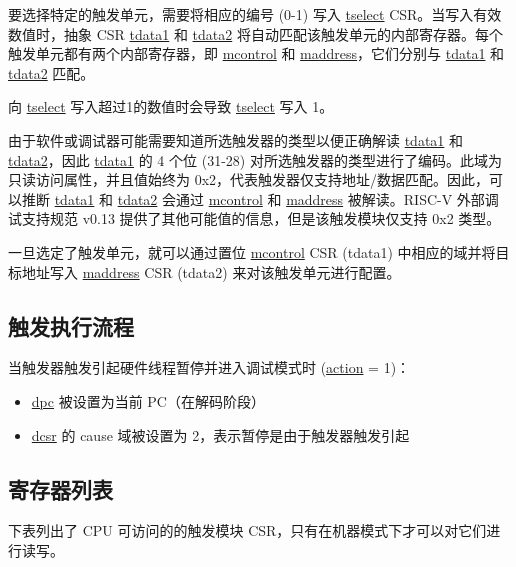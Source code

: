 \documentclass[main\_\_CN.tex]{subfiles}
\begin{document}
要选择特定的触发单元，需要将相应的编号 (0-1) 写入 \hyperref[regdesc:LPTSELECT]{tselect} CSR。当写入有效数值时，抽象 CSR \hyperref[regdesc:LPTDATA1]{tdata1} 和 \hyperref[regdesc:LPTDATA2]{tdata2} 将自动匹配该触发单元的内部寄存器。每个触发单元都有两个内部寄存器，即 \hyperref[regdesc:LPMCONTROL]{mcontrol} 和 \hyperref[regdesc:LPMADDRESS]{maddress}，它们分别与 \hyperref[regdesc:LPTDATA1]{tdata1} 和 \hyperref[regdesc:LPTDATA2]{tdata2} 匹配。

向 \hyperref[regdesc:LPTSELECT]{tselect} 写入超过1的数值时会导致 \hyperref[regdesc:LPTSELECT]{tselect} 写入 1。

由于软件或调试器可能需要知道所选触发器的类型以便正确解读 \hyperref[regdesc:LPTDATA1]{tdata1} 和 \hyperref[regdesc:LPTDATA2]{tdata2}，因此 \hyperref[regdesc:LPTDATA1]{tdata1} 的 4 个位 (31-28) 对所选触发器的类型进行了编码。此域为只读访问属性，并且值始终为 0x2，代表触发器仅支持地址/数据匹配。因此，可以推断 \hyperref[regdesc:LPTDATA1]{tdata1} 和 \hyperref[regdesc:LPTDATA2]{tdata2} 会通过 \hyperref[regdesc:LPMCONTROL]{mcontrol} 和 \hyperref[regdesc:LPMADDRESS]{maddress} 被解读。RISC-V 外部调试支持规范 v0.13 提供了其他可能值的信息，但是该触发模块仅支持 0x2 类型。

一旦选定了触发单元，就可以通过置位  \hyperref[regdesc:LPMCONTROL]{mcontrol} CSR (tdata1) 中相应的域并将目标地址写入 \hyperref[regdesc:LPMADDRESS]{maddress} CSR (tdata2) 来对该触发单元进行配置。


\subsection{触发执行流程}
\label{sec:ulp-hwt-suggest-op}

当触发器触发引起硬件线程暂停并进入调试模式时 (\hyperref[fielddesc:LPMCONTROLACTION]{action} = 1)：
\begin{itemize}
    \item \hyperref[regdesc:LPDPC]{dpc} 被设置为当前 PC（在解码阶段）
    \item \hyperref[regdesc:LPDCSR]{dcsr} 的 cause 域被设置为 2，表示暂停是由于触发器触发引起
\end{itemize}


\subsection{寄存器列表}
下表列出了 CPU 可访问的的触发模块 CSR，只有在机器模式下才可以对它们进行读写。


\end{document}
